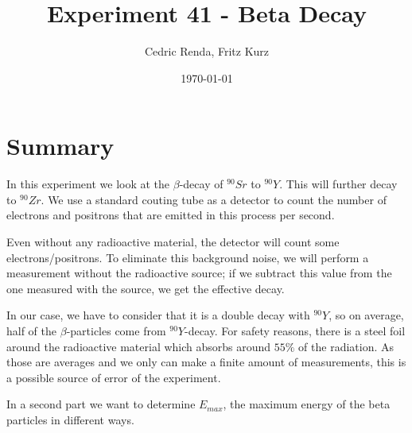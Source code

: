 \documentclass[12pt,a4paper]{article}
\title{Experiment 41 - Beta Decay}
\author{Cedric Renda, Fritz Kurz}
\date{\today }
\begin{document}
	\maketitle
	
	\section{Summary}
	In this experiment we look at the $\beta$-decay of $^{90}Sr$ to $^{90}Y$.
	This will further decay to $^{90}Zr$.
	We use a standard couting tube as a  detector to count the number of electrons and positrons that are emitted in this process per second.
	
	Even without any radioactive material, the detector will count some electrons/positrons.
	To eliminate this background noise, we will perform a measurement without the radioactive source; if we subtract this value from the one measured with the source, we get the effective decay.
	
	In our case, we have to consider that it is a double decay with $^{90}Y$, so on average, half of the $\beta $-particles come from $^{90}Y$-decay.
	For safety reasons, there is a steel foil around the radioactive material which absorbs around $55 \%$ of the radiation.
	As those are averages and we only can make a finite amount of measurements, this is a possible source of error of the experiment.

	In a second part we want to determine $E_{max}$, the maximum energy of the beta particles in different ways.
	


	
	
	
	
	
	
	
\end{document}
